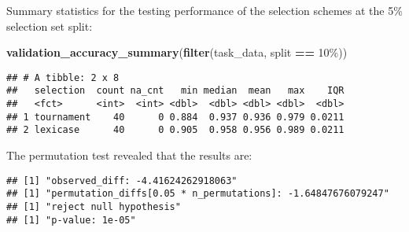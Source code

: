\documentclass[
]{book}
\newenvironment{Shaded}{\begin{snugshade}}{\end{snugshade}}
\newcommand{\AttributeTok}[1]{\textcolor[rgb]{0.13,0.29,0.53}{#1}}
\newcommand{\DecValTok}[1]{\textcolor[rgb]{0.00,0.00,0.81}{#1}}
\newcommand{\FunctionTok}[1]{\textcolor[rgb]{0.13,0.29,0.53}{\textbf{#1}}}
\newcommand{\NormalTok}[1]{#1}
\newcommand{\OtherTok}[1]{\textcolor[rgb]{0.56,0.35,0.01}{#1}}
\newcommand{\SpecialCharTok}[1]{\textcolor[rgb]{0.81,0.36,0.00}{\textbf{#1}}}
\newcommand{\StringTok}[1]{\textcolor[rgb]{0.31,0.60,0.02}{#1}}
\begin{document}
Summary statistics for the testing performance of the selection schemes at the 5\% selection set split:

\begin{Shaded}
\begin{Highlighting}[]
\FunctionTok{validation\_accuracy\_summary}\NormalTok{(}\FunctionTok{filter}\NormalTok{(task\_data, split }\SpecialCharTok{==} \StringTok{\textquotesingle{}10\%\textquotesingle{}}\NormalTok{))}
\end{Highlighting}
\end{Shaded}

\begin{verbatim}
## # A tibble: 2 x 8
##   selection  count na_cnt   min median  mean   max    IQR
##   <fct>      <int>  <int> <dbl>  <dbl> <dbl> <dbl>  <dbl>
## 1 tournament    40      0 0.884  0.937 0.936 0.979 0.0211
## 2 lexicase      40      0 0.905  0.958 0.956 0.989 0.0211
\end{verbatim}

The permutation test revealed that the results are:

\begin{Shaded}
\end{Shaded}

\begin{verbatim}
## [1] "observed_diff: -4.41624262918063"
## [1] "permutation_diffs[0.05 * n_permutations]: -1.64847676079247"
## [1] "reject null hypothesis"
## [1] "p-value: 1e-05"
\end{verbatim}
\end{document}
